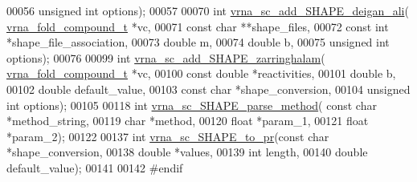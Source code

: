 \begin{DoxyCode}
00056                               \textcolor{keywordtype}{unsigned} \textcolor{keywordtype}{int} options);
00057 
00070 \textcolor{keywordtype}{int} \hyperlink{group__SHAPE__reactivities_ga04ba85da63d8c793bb8001d1e6f800ba}{vrna\_sc\_add\_SHAPE\_deigan\_ali}( 
      \hyperlink{group__fold__compound_structvrna__fc__s}{vrna\_fold\_compound\_t} *vc,
00071                                   \textcolor{keyword}{const} \textcolor{keywordtype}{char} **shape\_files,
00072                                   \textcolor{keyword}{const} \textcolor{keywordtype}{int} *shape\_file\_association,
00073                                   \textcolor{keywordtype}{double} m,
00074                                   \textcolor{keywordtype}{double} b,
00075                                   \textcolor{keywordtype}{unsigned} \textcolor{keywordtype}{int} options);
00076 
00099 \textcolor{keywordtype}{int} \hyperlink{group__SHAPE__reactivities_gaf3c65a045060aef5c4e41693d30af58c}{vrna\_sc\_add\_SHAPE\_zarringhalam}( 
      \hyperlink{group__fold__compound_structvrna__fc__s}{vrna\_fold\_compound\_t} *vc,
00100                                     \textcolor{keyword}{const} \textcolor{keywordtype}{double} *reactivities,
00101                                     \textcolor{keywordtype}{double} b,
00102                                     \textcolor{keywordtype}{double} default\_value,
00103                                     \textcolor{keyword}{const} \textcolor{keywordtype}{char} *shape\_conversion,
00104                                     \textcolor{keywordtype}{unsigned} \textcolor{keywordtype}{int} options);
00105 
00118 \textcolor{keywordtype}{int} \hyperlink{constraints__SHAPE_8h_a71b84eb0dd69e5c256f4ecf8f78cf314}{vrna\_sc\_SHAPE\_parse\_method}( \textcolor{keyword}{const} \textcolor{keywordtype}{char} *method\_string,
00119                                 \textcolor{keywordtype}{char} *method,
00120                                 \textcolor{keywordtype}{float} *param\_1,
00121                                 \textcolor{keywordtype}{float} *param\_2);
00122 
00137 \textcolor{keywordtype}{int} \hyperlink{group__SHAPE__reactivities_ga67675b3ed48744489a3bcfa4174197cb}{vrna\_sc\_SHAPE\_to\_pr}(\textcolor{keyword}{const} \textcolor{keywordtype}{char} *shape\_conversion,
00138                         \textcolor{keywordtype}{double} *values,
00139                         \textcolor{keywordtype}{int} length,
00140                         \textcolor{keywordtype}{double} default\_value);
00141 
00142 \textcolor{preprocessor}{#endif}
\end{DoxyCode}

